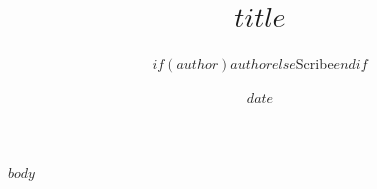 \documentclass[$fontsize$]{article}
\title{$title$}
\author{$if(author)$$author$$else$Scribe$endif$}
\date{$date$}
\begin{document}
\maketitle
$body$
\end{document}
